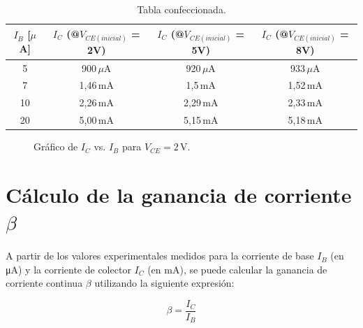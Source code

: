 \begin{table}[H]
\centering
\begin{tabular}{|c|c|c|c|}
\hline
$I_B$ [$\mu$A] & $I_C$ (@$V_{CE(inicial)}$ = 2V) & $I_C$ (@$V_{CE(inicial)}$ = 5V) & $I_C$ (@$V_{CE(inicial)}$ = 8V) \\
\hline
5  & 900\,$\mu$A  & 920\,$\mu$A  & 933\,$\mu$A \\
7  & 1{,}46\,mA   & 1{,}5\,mA    & 1{,}52\,mA  \\
10 & 2{,}26\,mA   & 2{,}29\,mA   & 2{,}33\,mA  \\
20 & 5{,}00\,mA   & 5{,}15\,mA   & 5{,}18\,mA  \\
\hline
\end{tabular}
\caption{Tabla confeccionada.}
\end{table}
\begin{figure}[h!]
\centering
{}
\caption{Gráfico de $I_C$ vs. $I_B$ para $V_{CE}=2\,\text{V}$.}
\end{figure}

\section{Cálculo de la ganancia de corriente $\beta$}

A partir de los valores experimentales medidos para la corriente de base $I_B$ (en \si{\micro\ampere}) y la corriente de colector $I_C$ (en \si{\milli\ampere}), se puede calcular la ganancia de corriente continua $\beta$ utilizando la siguiente expresión:

\[
\beta = \frac{I_C}{I_B}
\]

